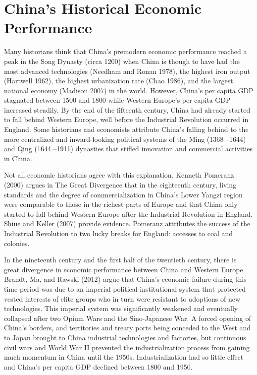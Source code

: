 \documentclass{article}
\begin{document}
    \section*{China’s Historical Economic Performance}
    Many historians think that China’s premodern economic performance reached a peak in the Song Dynasty (circa 1200) when China is though to have had the most advanced technologies (Needham and Ronan 1978), the highest iron output (Hartwell 1962), the highest urbanization rate (Chao 1986), and the largest national economy (Madison 2007) in the world. However, China’s per capita GDP stagnated between 1500 and 1800 while Western Europe’s per capita GDP increased steadily. By the end of the fifteenth century, China had already started to fall behind Western Europe, well before the Industrial Revolution occurred in England. Some historians and economists attribute China’s falling behind to the more centralized and inward-looking political systems of the Ming (1368 –1644) and Qing (1644 –1911) dynasties that stifled innovation and commercial activities in China.

    Not all economic historians agree with this explanation. Kenneth Pomeranz (2000) argues in The Great Divergence that in the eighteenth century, living standards and the degree of commercialization in China’s Lower Yangzi region were comparable to those in the richest parts of Europe and that China only started to fall behind Western Europe after the Industrial Revolution in England. Shiue and Keller (2007) provide evidence. Pomeranz attributes the success of the Industrial Revolution to two lucky breaks for England: accesses to coal and colonies.

    In the nineteenth century and the first half of the twentieth century, there is great divergence in economic performance between China and Western Europe. Brandt, Ma, and Rawski (2012) argue that China’s economic failure during this time period was due to an imperial political-institutional system that protected vested interests of elite groups who in turn were resistant to adoptions of new technologies. This imperial system was significantly weakened and eventually collapsed after two Opium Wars and the Sino-Japanese War. A forced opening of China’s borders, and territories and treaty ports being conceded to the West and to Japan brought to China industrial technologies and factories, but continuous civil wars and World War II prevented the industrialization process from gaining much momentum in China until the 1950s.  Industrialization had so little effect and China’s per capita GDP declined between 1800 and 1950.
\end{document}

